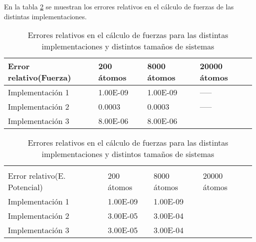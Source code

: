 En la tabla \ref{tabla-errorRelativo-potencial} se muestran los errores relativos en el cálculo de fuerzas de las distintas implementaciones.





\begin{table}[h]

\begin{minipage}{\linewidth}
\centering
\begin{tabular}{@{}llll@{}}

Error relativo(Fuerza)	 & 200 átomos            	& 8000 átomos        		& 20000 átomos \\ \bottomrule 
Implementación 1	 & 1.00E-09 			& 1.00E-09 			& 	-----	 \\ \hline
Implementación 2	 & 0.0003			& 0.0003			& 	-----	\\ \hline
Implementación 3	 & 8.00E-06 			& 8.00E-06			& 		 

\end{tabular}
\caption{Errores relativos en el cálculo de fuerzas para las distintas implementaciones y distintos tamaños de sistemas}
\label{tabla-errorRelativo-fuerzas}
\end{minipage}

\begin{minipage}{\linewidth}
\centering
\begin{tabular}{@{}llll@{}}
\\
\\
Error relativo(E. Potencial)	 & 200 átomos            	& 8000 átomos        		& 20000 átomos \\ \bottomrule 
Implementación 1	 & 1.00E-09 			& 1.00E-09 			& 		 \\ \hline
Implementación 2	 & 3.00E-05 			& 3.00E-04			&  		\\ \hline
Implementación 3	 & 3.00E-05	 		& 3.00E-04 			& 		 \\ \bottomrule

\end{tabular}
\end{minipage}
\caption{Errores relativos en el cálculo de fuerzas para las distintas implementaciones y distintos tamaños de sistemas}
\label{tabla-errorRelativo-potencial}
\end{table}


